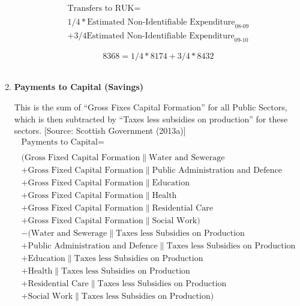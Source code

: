 \begin{enumerate}
\begin{equation}
\begin{split}
\text{Transfers to RUK} =  \\ \\
1/4*\text{Estimated Non-Identifiable Expenditure}_\text{08-09}\\
+3/4\text{Estimated Non-Identifiable Expenditure}_\text{09-10}
\end{split} \label{eq:2.5.45}
\end{equation}

\begin{equation} \nonumber
8368 = 1/4*8174+3/4*8432
\end{equation}\\


\item \textbf {Payments to Capital (Savings)}

This is the sum of “Gross Fixes Capital Formation” for all Public Sectors, which is then subtracted by “Taxes less subsidies on production” for these sectors. [Source: Scottish Government (2013a)]\\

\begin{equation}
\begin{split}
\text{Payments to Capital} =  \\ \\
(\text{Gross Fixed Capital Formation}\|\text{Water and Sewerage}\\
+\text{Gross Fixed Capital Formation}\|\text{Public Administration and Defence}\\
+\text{Gross Fixed Capital Formation}\|\text{Education}\\
+\text{Gross Fixed Capital Formation}\|\text{Health}\\
+\text{Gross Fixed Capital Formation}\|\text{Residential Care}\\
+\text{Gross Fixed Capital Formation}\|\text{Social Work})\\
-(\text{Water and Sewerage}\|\text{Taxes less Subsidies on Production}\\
+\text{Public Administration and Defence}\|\text{Taxes less Subsidies on Production}\\
+\text{Education}\|\text{Taxes less Subsidies on Production}\\
+\text{Health}\|\text{Taxes less Subsidies on Production}\\
+\text{Residential Care}\|\text{Taxes less Subsidies on Production}\\
+\text{Social Work}\|\text{Taxes less Subsidies on Production})
\end{split} \label{eq:2.5.46}
\end{equation}


\end{enumerate}
